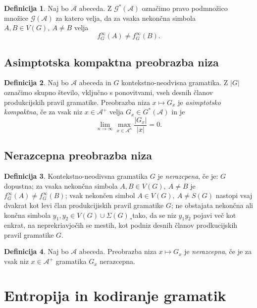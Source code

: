 \documentclass{amsart}
\newcommand{\G}{\mathcal{G}}
\newcommand{\A}{\mathcal{A}}
\theoremstyle{definition}
\newtheorem{definicija}{Definicija}[section]
\theoremstyle{plain} %
\begin{document}

\begin{definicija}

    Naj bo $\A$ abeceda. Z $\G^*(\A)$ označimo pravo podmnožico množice $\G(\A)$ za katero velja, da za vsaka nekončna simbola $ A,B \in V(G), \ A \neq B $ velja
    \[
        f_G^\infty(A) \neq f_G^\infty(B).
    \]
    
\end{definicija}

\subsection{Asimptotska kompaktna preobrazba niza}

\begin{definicija}

    Naj bo $\A$ abeceda in $G$ kontekstno-neodvisna gramatika. Z $|G|$ označimo skupno število, vključno s ponovitvami, vseh desnih članov produkcijskih pravil gramatike. Preobrazba niza $x \mapsto G_x$ je \textit{asimptotsko kompaktna}, če za vsak niz $x \in \A^+$ velja $G_x \in G^*(\A)$ in je
    \[
        \lim_{n \rightarrow \infty} \max_{x \in \A^n} \frac{|G_x|}{|x|} = 0.
    \]

\end{definicija}

\subsection{Nerazcepna preobrazba niza}

\begin{definicija}
    
    Kontekstno-neodivsna gramatika $G$ je \textit{nerazcpena}, če je: $G$ dopustna; za vsaka nekončna simbola $ A,B \in V(G), \ A \neq B $ je $ f_G^\infty(A) \neq f_G^\infty(B) $; vsak nekončen simbol $ A \in V(G), \ A \neq S(G) $ nastopi vsaj dvakrat kot levi član produkcijiskih pravil gramatike $G$; ne obstajata nekončna ali končna simbola $ y_1, y_2 \in V(G) \cup \Sigma(G) $¸tako, da se niz $ y_1y_2 $ pojavi več kot enkrat, na neprekriavjočih se mestih, kot podniz desnih članov prodkucijskih pravil gramatike $G$.

\end{definicija}


\begin{definicija}

    Naj bo $\A$ abeceda. Preobrazba niza $x \mapsto G_x$ je \textit{nerazcepna}, če je za vsak niz $x \in \A^+$ gramatika $G_x$ nerazcepna.
    
\end{definicija}

\section{Entropija in kodiranje gramatik}
\end{document}
